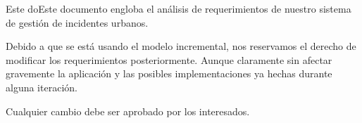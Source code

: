 Este doEste documento engloba el análisis de requerimientos de nuestro sistema de gestión de incidentes urbanos.

Debido a que se está usando el modelo incremental, nos reservamos el derecho de modificar los requerimientos posteriormente. Aunque claramente sin afectar gravemente la aplicación y las posibles implementaciones ya hechas durante alguna iteración.

Cualquier cambio debe ser aprobado por los interesados.